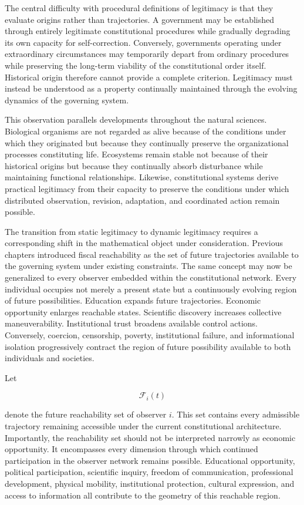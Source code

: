 \documentclass[12pt,a4paper]{article}
\begin{document}
The central difficulty with procedural definitions of legitimacy is that they evaluate origins rather than trajectories. A government may be established through entirely legitimate constitutional procedures while gradually degrading its own capacity for self-correction. Conversely, governments operating under extraordinary circumstances may temporarily depart from ordinary procedures while preserving the long-term viability of the constitutional order itself. Historical origin therefore cannot provide a complete criterion. Legitimacy must instead be understood as a property continually maintained through the evolving dynamics of the governing system.

This observation parallels developments throughout the natural sciences. Biological organisms are not regarded as alive because of the conditions under which they originated but because they continually preserve the organizational processes constituting life. Ecosystems remain stable not because of their historical origins but because they continually absorb disturbance while maintaining functional relationships. Likewise, constitutional systems derive practical legitimacy from their capacity to preserve the conditions under which distributed observation, revision, adaptation, and coordinated action remain possible.

The transition from static legitimacy to dynamic legitimacy requires a corresponding shift in the mathematical object under consideration. Previous chapters introduced fiscal reachability as the set of future trajectories available to the governing system under existing constraints. The same concept may now be generalized to every observer embedded within the constitutional network. Every individual occupies not merely a present state but a continuously evolving region of future possibilities. Education expands future trajectories. Economic opportunity enlarges reachable states. Scientific discovery increases collective maneuverability. Institutional trust broadens available control actions. Conversely, coercion, censorship, poverty, institutional failure, and informational isolation progressively contract the region of future possibility available to both individuals and societies.

Let

\[
\mathcal{F}_i(t)
\]

denote the future reachability set of observer \(i\). This set contains every admissible trajectory remaining accessible under the current constitutional architecture. Importantly, the reachability set should not be interpreted narrowly as economic opportunity. It encompasses every dimension through which continued participation in the observer network remains possible. Educational opportunity, political participation, scientific inquiry, freedom of communication, professional development, physical mobility, institutional protection, cultural expression, and access to information all contribute to the geometry of this reachable region.
\end{document}
